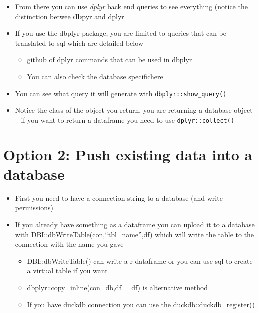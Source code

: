 \documentclass[
  letterpaper,
  DIV=11,
  numbers=noendperiod]{scrreprt}
\providecommand{\tightlist}{%
  \setlength{\itemsep}{0pt}\setlength{\parskip}{0pt}}\usepackage{longtable,booktabs,array}
\begin{document}
\begin{itemize}
\item
  From there you can use \emph{dplyr} back end queries to see everything
  (notice the distinction betwee \textbf{db}pyr and dplyr
\item
  If you use the dbplyr package, you are limited to queries that can be
  translated to sql which are detailed below

  \begin{itemize}
  \tightlist
  \item
    \href{https://github.com/tidyverse/dbplyr/blob/main/R/backend-.R}{github
    of dplyr commands that can be used in dbplyr}
  \item
    You can also check the database
    specific\href{\%5Bhttps://github.com/tidyverse/dbplyr/blob/main/R/backend-snowflake.R}{here}
  \end{itemize}
\item
  You can see what query it will generate with
  \texttt{dbplyr::show\_query()}
\item
  Notice the class of the object you return, you are returning a
  database object -- if you want to return a dataframe you need to use
  \texttt{dplyr::collect()}
\end{itemize}

\section{Option 2: Push existing data into a
database}\label{option-2-push-existing-data-into-a-database}

\begin{itemize}
\item
  First you need to have a connection string to a database (and write
  permissions)
\item
  If you already have something as a dataframe you can upload it to a
  database with DBI::dbWriteTable(con,``tbl\_name'',df) which will write
  the table to the connection with the name you gave

  \begin{itemize}
  \tightlist
  \item
    DBI::dbWriteTable() can write a r dataframe or you can use sql to
    create a virtual table if you want
  \item
    dbplyr::copy\_inline(con\_db,df = df) is alternative method
  \item
    If you have duckdb connection you can use the
    duckdb::duckdb\_register()
  \end{itemize}
\end{itemize}
\end{document}
